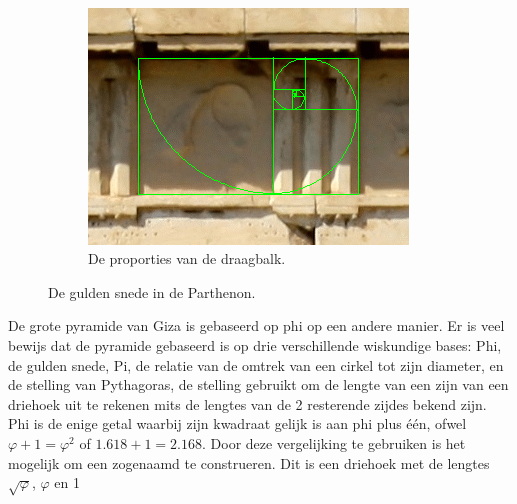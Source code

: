 \documentclass{article}
\begin{document}
\begin{figure}[Hh]
\begin{subfigure}[b]{0.3\textwidth}
    \end{subfigure}%
    ~
	\begin{subfigure}[b]{0.45\textwidth}
        \includegraphics[width=\textwidth]{parthenon-beam.png}
		\caption{De proporties van de draagbalk.}
		\label{fig:parthenon-beam}
    \end{subfigure}%
    
    \caption{De gulden snede in de Parthenon.}
    \label{fig:animals}
\end{figure}

De grote pyramide van Giza is gebaseerd op phi op een andere manier. Er is veel bewijs dat de pyramide gebaseerd is op drie verschillende wiskundige bases: Phi, de gulden snede, Pi, de relatie van de omtrek van een cirkel tot zijn diameter, en de stelling van Pythagoras, de stelling gebruikt om de lengte van een zijn van een driehoek uit te rekenen mits de lengtes van de 2 resterende zijdes bekend zijn. Phi is de enige getal waarbij zijn kwadraat gelijk is aan phi plus \'e\'en, ofwel \(\varphi + 1 = \varphi^2\) of \(1.618 + 1 = 2.168\). Door deze vergelijking te gebruiken is het mogelijk om een zogenaamd  te construeren. Dit is een driehoek met de lengtes \(\sqrt{\varphi}\), \(\varphi\) en 1\)
\end{document}
